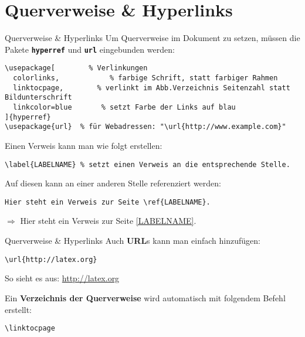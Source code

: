 \section{Querverweise \& Hyperlinks}
\begin{frame}[fragile]{Querverweise \& Hyperlinks}
Um Querverweise im Dokument zu setzen, müssen die Pakete \textbf{\texttt{hyperref}} und \textbf{\texttt{url}} eingebunden werden:
\begin{lstlisting}[style=tex]
\usepackage[        % Verlinkungen
  colorlinks,            % farbige Schrift, statt farbiger Rahmen
  linktocpage,        % verlinkt im Abb.Verzeichnis Seitenzahl statt Bildunterschrift
  linkcolor=blue       % setzt Farbe der Links auf blau
]{hyperref}
\usepackage{url}  % für Webadressen: "\url{http://www.example.com}"
\end{lstlisting}%

\bigskip
Einen Verweis\label{LABELNAME} kann man wie folgt erstellen:
\begin{lstlisting}[style=tex]
\label{LABELNAME} % setzt einen Verweis an die entsprechende Stelle.
\end{lstlisting}

Auf diesen kann an einer anderen Stelle referenziert werden:
\begin{lstlisting}[style=tex]
Hier steht ein Verweis zur Seite \ref{LABELNAME}.
\end{lstlisting}%

\bigskip
$\Rightarrow$ Hier steht ein Verweis zur Seite \ref{LABELNAME}.
\end{frame}

\begin{frame}[fragile]{Querverweise \& Hyperlinks}
Auch \textbf{URL}s kann man einfach hinzufügen:
\begin{lstlisting}[style=tex]
\url{http://latex.org}
\end{lstlisting}
So sieht es aus: \url{http://latex.org}%

\bigskip
Ein \textbf{Verzeichnis der Querverweise} wird automatisch mit folgendem Befehl erstellt:
\begin{lstlisting}[style=tex]
\linktocpage
\end{lstlisting}
\end{frame}
